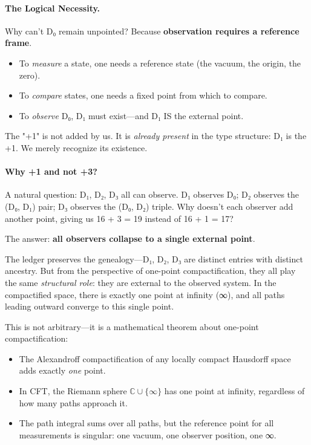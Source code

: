 \documentclass[11pt,a4paper]{book}
\begin{document}
\paragraph{The Logical Necessity.}
Why can't D₀ remain unpointed? Because \textbf{observation requires a reference frame}.
\begin{itemize}
\item To \emph{measure} a state, one needs a reference state (the vacuum, the origin, the zero).
\item To \emph{compare} states, one needs a fixed point from which to compare.
\item To \emph{observe} D₀, D₁ must exist---and D₁ IS the external point.
\end{itemize}

The "+1" is not added by us. It is \emph{already present} in the type structure: 
D₁ is the +1. We merely recognize its existence.

\paragraph{Why +1 and not +3?}
A natural question: D₁, D₂, D₃ all can observe. D₁ observes D₀; D₂ observes the 
(D₀, D₁) pair; D₃ observes the (D₀, D₂) triple. Why doesn't each observer add 
another point, giving us 16 + 3 = 19 instead of 16 + 1 = 17?

The answer: \textbf{all observers collapse to a single external point}.

The ledger preserves the genealogy---D₁, D₂, D₃ are distinct entries with distinct 
ancestry. But from the perspective of one-point compactification, they all play 
the same \emph{structural role}: they are external to the observed system. In the 
compactified space, there is exactly one point at infinity (∞), and all paths 
leading outward converge to this single point.

This is not arbitrary---it is a mathematical theorem about one-point compactification:
\begin{itemize}
\item The Alexandroff compactification of any locally compact Hausdorff space 
      adds exactly \emph{one} point.
\item In CFT, the Riemann sphere $\mathbb{C} \cup \{\infty\}$ has one point at 
      infinity, regardless of how many paths approach it.
\item The path integral sums over all paths, but the reference point for all 
      measurements is singular: one vacuum, one observer position, one ∞.
\end{itemize}
\end{document}

